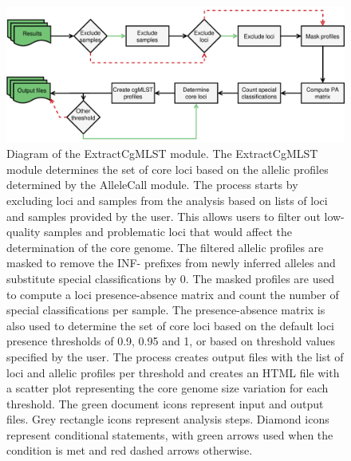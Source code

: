 \newpage
\begin{figure}[h!]
    \centering
    \includegraphics[angle=0,width=\textwidth]{figures/chapter 2/FigureS12.pdf}
    \caption{Diagram of the ExtractCgMLST module. The ExtractCgMLST module determines the set of core loci based on the allelic profiles determined by the AlleleCall module. The process starts by excluding loci and samples from the analysis based on lists of loci and samples provided by the user. This allows users to filter out low-quality samples and problematic loci that would affect the determination of the core genome. The filtered allelic profiles are masked to remove the INF- prefixes from newly inferred alleles and substitute special classifications by 0. The masked profiles are used to compute a loci presence-absence matrix and count the number of special classifications per sample. The presence-absence matrix is also used to determine the set of core loci based on the default loci presence thresholds of 0.9, 0.95 and 1, or based on threshold values specified by the user. The process creates output files with the list of loci and allelic profiles per threshold and creates an HTML file with a scatter plot representing the core genome size variation for each threshold. The green document icons represent input and output files. Grey rectangle icons represent analysis steps. Diamond icons represent conditional statements, with green arrows used when the condition is met and red dashed arrows otherwise.}
    \label{fig:chap2_figureS12}
\end{figure}

